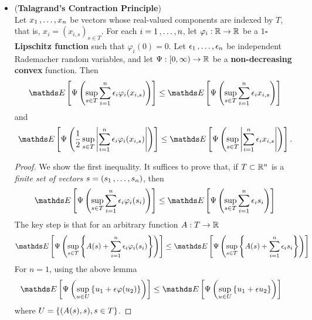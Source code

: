 \documentclass[11pt]{article}
\begin{document}
\begin{itemize}
\item \begin{proposition}(\textbf{Talagrand's Contraction Principle}) \citep{boucheron2013concentration, vershynin2018high}\\
Let $x_1 \,{,}\ldots{,}\, x_n$ be vectors whose real-valued components are indexed by $T$, that is, $x_i = (x_{i,s})_{s \in T}$. For each $i = 1 \,{,}\ldots{,}\, n$, let $\varphi_i : {\mathbb R} \to {\mathbb R}$ be a \textbf{$1$-Lipschitz function} such that $\varphi_i(0) = 0$. Let $\epsilon_1 \,{,}\ldots{,}\, \epsilon_n$ be independent Rademacher random variables, and let $\Psi: [0, \infty) \to {\mathbb R}$ be a \textbf{non-decreasing convex} function.  Then
\begin{align}
\E{}{\Psi\paren{\sup_{s\in T}\sum_{i=1}^n \epsilon_i \varphi_i(x_{i,s})}} \le \E{}{\Psi\paren{\sup_{s\in T}\sum_{i=1}^n \epsilon_i  x_{i,s}}}\label{ineqn: contraction_principle_1}
\end{align} and
\begin{align}
\E{}{\Psi\paren{\frac{1}{2}\sup_{s\in T}\abs{\sum_{i=1}^n \epsilon_i \varphi_i(x_{i,s})}}} \le \E{}{\Psi\paren{\sup_{s\in T}\abs{\sum_{i=1}^n \epsilon_i  x_{i,s}}}}.\label{ineqn: contraction_principle_2}
\end{align}
\end{proposition}
\begin{proof}
We show the first inequality.  It suffices to prove that, if $T \subset {\mathbb R}^n$ is a \emph{finite set of vectors} $s = (s_1 \,{,}\ldots{,}\, s_n)$, then
\begin{align*}
\E{}{\Psi\paren{\sup_{s\in T}\sum_{i=1}^n \epsilon_i \varphi_i(s_i)}} \le \E{}{\Psi\paren{\sup_{s\in T}\sum_{i=1}^n \epsilon_i s_i}}
\end{align*} The key step is that for an arbitrary function $A : T \to {\mathbb R}$
\begin{align*}
\E{}{\Psi\paren{\sup_{s\in T}\set{A(s) + \sum_{i=1}^n \epsilon_i \varphi_i(s_i)}}} \le \E{}{\Psi\paren{\sup_{s\in T}\set{A(s) + \sum_{i=1}^n \epsilon_i s_i}}}
\end{align*} For $n=1$, using the above lemma
\begin{align*}
\E{}{\Psi\paren{\sup_{u \in U}\set{u_1 + \epsilon \varphi(u_2)}}} &\le \E{}{\Psi\paren{\sup_{u \in U}\set{u_1 + \epsilon u_2}} }
\end{align*} where $U = \left\{(A(s), s), s\in T\right\}$. 


\end{proof}
\end{itemize}
\end{document}
